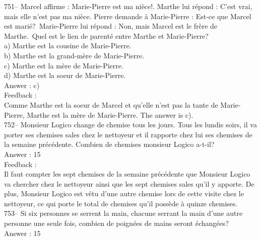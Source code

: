 \documentclass[letterpaper, 12pt]{article}
\begin{document}
751-- Marcel affirme : \og Marie-Pierre est ma ni\`ece!\fg .  Marthe
lui r\'epond : \og C'est vrai, mais elle n'est pas ma ni\`ece\fg .
Pierre demande \`a Marie-Pierre : \og Est-ce que Marcel est
mari\'e?\fg\ Marie-Pierre lui r\'epond : \og Non, mais Marcel est le
fr\`ere de Marthe.\fg\  Quel est le lien de parent\'e
entre Marthe et Marie-Pierre?\\
a) Marthe est la cousine de Marie-Pierre.\\
b) Marthe est la grand-m\`ere de Marie-Pierre.\\
c) Marthe est la m\`ere de Marie-Pierre.\\
d) Marthe est la soeur de Marie-Pierre.\\

Answer : c)\\

Feedback : \\
Comme Marthe est la soeur de Marcel et qu'elle n'est pas la tante de
Marie-Pierre, Marthe est la m\`ere de Marie-Pierre.  The answer is c).\\

752-- Monsieur Logico change de chemise tous les jours.  Tous les lundis
soirs, il va porter ses chemises sales chez le nettoyeur et il rapporte chez
lui ses chemises de la semaine pr\'ec\'edente.  Combien de chemises monsieur
Logico a-t-il?\\

Answer : 15\\

Feedback : \\
Il faut compter les sept chemises de la semaine pr\'ec\'edente que Monsieur
Logico va chercher chez le nettoyeur ainsi que les sept chemises sales qu'il
y apporte. De plus, Monsieur Logico est v\^etu d'une autre chemise lors de
cette visite chez le nettoyeur, ce qui porte le total de chemises qu'il
poss\`ede \`a quinze chemises.\\

753-- Si six personnes se serrent la main, chacune serrant la main d'une
autre personne une seule fois, combien de poign\'ees de mains seront
\'echang\'ees?\\

Answer : 15\\
\end{document}
